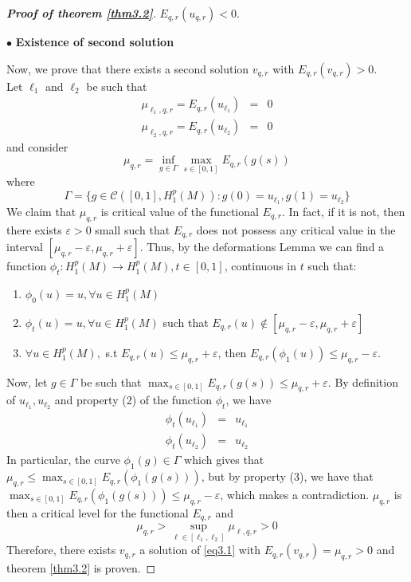 \documentclass{Tran-l}
\theoremstyle{definition}
\theoremstyle{remark}
\numberwithin{equation}{section}
\begin{document}
\begin{proof}[\textbf{Proof of theorem \ref{thm3.2}}]
$E_{q,r}(u_{q,r})<0$.
\begin{flushleft}
    $\bullet$ \textbf{Existence of second solution}
\end{flushleft}
Now, we prove that there exists a
second solution $v_{q,r}$  with $E_{q,r}(v_{q,r})>0$.\\
 Let
$\ell_1$ and $\ell_2$ be such that
\begin{eqnarray*}
\mu_{\ell_1,q,r}=E_{q,r}(u_{\ell_1 })&=&0\\
\mu_{\ell_2,q,r}=E_{q,r}(u_{\ell_2} )&=&0
\end{eqnarray*}
and consider
\begin{equation*}
    \mu_{q,r}=\inf_{g\in\Gamma}\max_{s\in[0,1]}E_{q,r}(g(s))
\end{equation*}
where
\begin{equation*}
\Gamma=\{g\in{\mathcal{C}}([0,1],H^p_1(M)):g(0)=u_{\ell_1 },g(1)=u_{\ell_2}\}
\end{equation*}
We claim that $\mu_{q,r}$ is critical value of the functional
$E_{q,r}$. In fact, if it is not, then there exists $\varepsilon>0$
small such that $E_{q,r}$ does not possess any critical value in the
interval $[\mu_{q,r}-\varepsilon,\mu_{q,r}+\varepsilon]$. Thus, by
the deformations Lemma we can find a function
$\phi_t:H^p_1(M)\longrightarrow H^p_1(M), t\in[0,1]$, continuous in
$t$ such that:\begin{enumerate}
                \item $\phi_0(u)=u,\forall u\in H^p_1(M)$
                \item $\phi_t(u)=u,\forall u\in H^p_1(M)$ such that
$E_{q,r}(u)\not\in[\mu_{q,r}-\varepsilon,\mu_{q,r}+\varepsilon]$
                \item $\forall u\in H^p_1(M),$ s.t $
E_{q,r}(u)\leq\mu_{q,r}+\varepsilon$, then $
 E_{q,r}(\phi_1(u))\leq\mu_{q,r}-\varepsilon$.
              \end{enumerate}
Now, let $g\in \Gamma$ be such that
$\max_{s\in[0,1]}E_{q,r}(g(s))\leq\mu_{q,r}+\varepsilon$. By
definition of $u_{\ell_1},u_{\ell_2}$ and property (2) of the
function $\phi_t$, we have
\begin{eqnarray*}
   
\phi_t(u_{\ell_1}) &=& u_{\ell_1}\\
 \phi_t(u_{\ell_2})&=&u_{\ell_2}
\end{eqnarray*}
In particular, the curve $\phi_1(g)\in\Gamma$ which gives that
$\mu_{q,r}\leq \max_{s\in[0,1]}E_{q,r}(\phi_1(g(s)))$, but by
property (3), we have that
$\max_{s\in[0,1]}E_{q,r}(\phi_1(g(s)))\leq\mu_{q,r}-\varepsilon$,
which makes  a contradiction. $\mu_{q,r}$ is then a critical level
for the functional $E_{q,r}$ and
\begin{equation*}
\mu_{q,r}>\sup_{\ell\in[\ell_1,\ell_2]}\mu_{\ell,q,r}>0
\end{equation*}
Therefore, there exists $v_{q,r}$ a solution  of \eqref{eq3.1} with
$E_{q,r}(v_{q,r})=\mu_{q,r}>0$ and theorem \ref{thm3.2} is proven.
\end{proof}
\end{document}

